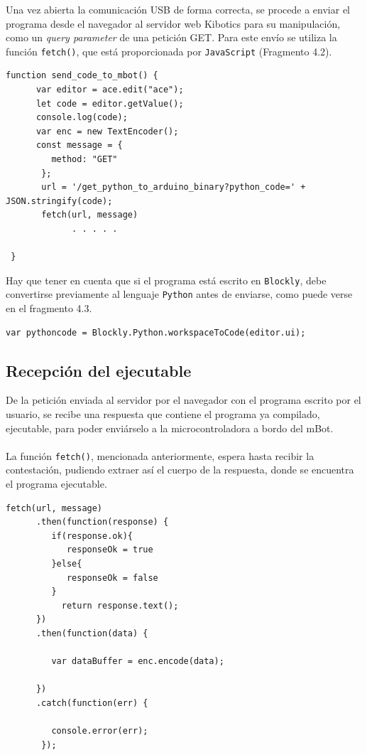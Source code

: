 \documentclass{report}
\begin{document}
Una vez abierta la comunicación USB de forma correcta, se procede a enviar el programa desde el navegador al servidor web Kibotics para su manipulación, como un \textit{query parameter} de una petición GET. Para este envío se utiliza la función \texttt{fetch()}, que está proporcionada por \texttt{JavaScript} (Fragmento 4.2).
\\
\begin{lstlisting}[frame=single,breaklines=true, label=Envío del programa desde el navegador al servidor web, caption=Envío del programa desde el navegador al servidor web, captionpos=b]
   function send_code_to_mbot() {
      var editor = ace.edit("ace");
      let code = editor.getValue();
      console.log(code);
      var enc = new TextEncoder();
      const message = {
         method: "GET"
       };
       url = '/get_python_to_arduino_binary?python_code=' + JSON.stringify(code);
       fetch(url, message)
             . . . . .
  
 }
\end{lstlisting}
Hay que tener en cuenta que si el programa está escrito en \texttt{Blockly}, debe convertirse previamente al lenguaje \texttt{Python} antes de enviarse, como puede verse en el fragmento 4.3.
\\
\begin{lstlisting}[frame=single,breaklines=true, label=Conversión de Blockly a Python, caption=Conversión de Blockly a Python, captionpos=b]
   var pythoncode = Blockly.Python.workspaceToCode(editor.ui);
\end{lstlisting}

\subsection{Recepción del ejecutable}

De la petición enviada al servidor por el navegador con el programa escrito por el usuario, se recibe una respuesta que contiene el programa ya compilado, ejecutable, para poder enviárselo a la microcontroladora a bordo del mBot.
\\
\\
La función \texttt{fetch()}, mencionada anteriormente, espera hasta recibir la contestación, pudiendo extraer  así el cuerpo de la respuesta, donde se encuentra el programa ejecutable.
\\
\begin{lstlisting}[frame=single,breaklines=true, label=Extracción del dato enviado en la respuesta, caption=Extracción del dato enviado en la respuesta, captionpos=b]
   fetch(url, message)
      .then(function(response) {
         if(response.ok){
            responseOk = true
         }else{
            responseOk = false
         }
           return response.text();
      })
      .then(function(data) {
        
         var dataBuffer = enc.encode(data);
           
      })
      .catch(function(err) {

         console.error(err);
       });

\end{lstlisting}
\end{document}
